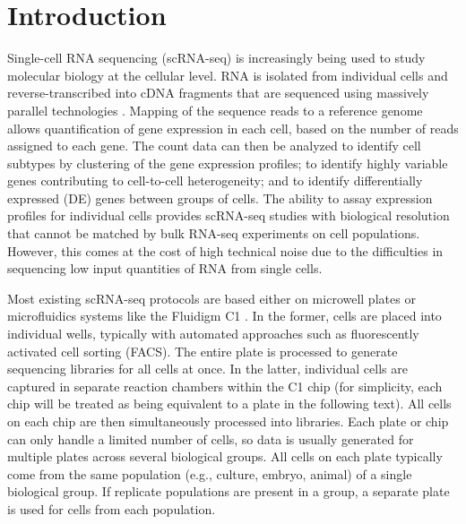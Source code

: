 \documentclass[oupdraft]{bio}
\begin{document}
\newcommand{\suppimplementation}{1}
\newcommand{\suppquantile}{2}
\newcommand{\suppmeanvar}{3}
\newcommand{\suppnorm}{4}

\newcommand{\suppcompsim}{S1}
\newcommand{\suppexpprof}{S2}

\section{Introduction}
Single-cell RNA sequencing (scRNA-seq) is increasingly being used to study molecular biology at the cellular level.
RNA is isolated from individual cells and reverse-transcribed into cDNA fragments that are sequenced using massively parallel technologies \citep{stegle2015computational}.
Mapping of the sequence reads to a reference genome allows quantification of gene expression in each cell, based on the number of reads assigned to each gene.
The count data can then be analyzed to identify cell subtypes by clustering of the gene expression profiles;
    to identify highly variable genes contributing to cell-to-cell heterogeneity;
    and to identify differentially expressed (DE) genes between groups of cells.
The ability to assay expression profiles for individual cells provides scRNA-seq studies with biological resolution that cannot be matched by bulk RNA-seq experiments on cell populations.
However, this comes at the cost of high technical noise due to the difficulties in sequencing low input quantities of RNA from single cells.

Most existing scRNA-seq protocols are based either on microwell plates \citep{picelli2014full} or microfluidics systems like the Fluidigm C1 \citep{pollen2014low}.
In the former, cells are placed into individual wells, typically with automated approaches such as fluorescently activated cell sorting (FACS).
The entire plate is processed to generate sequencing libraries for all cells at once.
In the latter, individual cells are captured in separate reaction chambers within the C1 chip 
    (for simplicity, each chip will be treated as being equivalent to a plate in the following text).
All cells on each chip are then simultaneously processed into libraries.
Each plate or chip can only handle a limited number of cells, so data is usually generated for multiple plates across several biological groups. 
All cells on each plate typically come from the same population (e.g., culture, embryo, animal) of a single biological group.
If replicate populations are present in a group, a separate plate is used for cells from each population.
\end{document}
